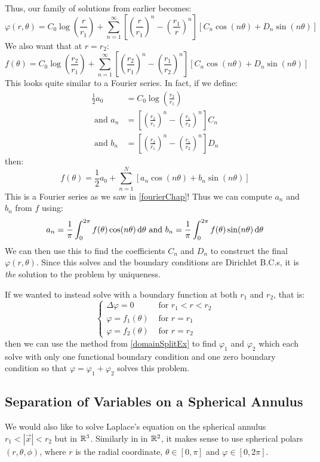 \documentclass[../main.tex]{subfiles}
\begin{document}
\begin{example}
  Thus, our family of solutions from earlier becomes:
  \[
    \varphi(r, \theta) = C_0 \log\left(\frac{r}{r_1}\right) + \sum_{n = 1}^{\infty} \left[\left(\frac{r}{r_1}\right)^n - \left(\frac{r_1}{r}\right)^{n}\right][C_n \cos(n\theta) + D_n \sin(n \theta)]
  \]
  We also want that at $r = r_2$:
  \[
    f(\theta) = C_0 \log\left(\frac{r_2}{r_1}\right) + \sum_{n = 1}^{\infty} \left[\left(\frac{r_2}{r_1}\right)^n - \left(\frac{r_1}{r_2}\right)^{n}\right][C_n \cos(n\theta) + D_n \sin(n \theta)]
  \]
  This looks quite similar to a Fourier series.
  In fact, if we define:
  \begin{align*}
    \frac{1}{2} a_0 &= C_0 \log\left(\frac{r_2}{r_1}\right) \\
    \text{ and } a_n &= \left[\left(\frac{r_2}{r_1}\right)^n - \left(\frac{r_1}{r_2}\right)^{n}\right]C_n \\
    \text{ and } b_n &= \left[\left(\frac{r_2}{r_1}\right)^n - \left(\frac{r_1}{r_2}\right)^{n}\right]D_n
  \end{align*}
  then:
  \[
    f(\theta) = \frac{1}{2} a_0 + \sum_{n = 1}^{N} [a_n \cos(n\theta) + b_n \sin(n\theta)]
  \]
  This is a Fourier series as we saw in \cref{fourierChap}!
  Thus we can compute $a_n$ and $b_n$ from $f$ using:
  \[
    a_n = \frac{1}{\pi} \int_{0}^{2\pi} f(\theta) \cos(n\theta) \d{\theta} \text{ and } b_n = \frac{1}{\pi} \int_{0}^{2\pi} f(\theta) \sin(n\theta) \d{\theta}
  \]
  We can then use this to find the coefficients $C_n$ and $D_n$ to construct the final $\varphi(r, \theta)$.
  Since this solves and the boundary conditions are Dirichlet B.C.s, it is \textit{the} solution to the problem by uniqueness.

  If we wanted to instead solve with a boundary function at both $r_1$ and $r_2$, that is:
  \[
    \begin{cases}
    \Delta \varphi = 0 & \text{ for } r_1 < r < r_2 \\
    \varphi = f_1(\theta) & \text{ for }r = r_1 \\
    \varphi = f_2(\theta) & \text{ for } r = r_2
    \end{cases}
  \]
  then we can use the method from \cref{domainSplitEx} to find $\varphi_1$ and $\varphi_2$ which each solve with only one functional boundary condition and one zero boundary condition so that $\varphi = \varphi_1 + \varphi_2$ solves this problem.
\end{example}
\subsection{Separation of Variables on a Spherical Annulus}
We would also like to solve Laplace's equation on the spherical annulus $r_1 < |\vec{x}| < r_2$ but in $\mathbb{R}^3$.
Similarly in in $\mathbb{R}^2$, it makes sense to use spherical polars $(r, \theta, \phi)$, where $r$ is the radial coordinate, $\theta \in [0, \pi]$ and $\varphi \in [0, 2\pi]$.
\end{document}
